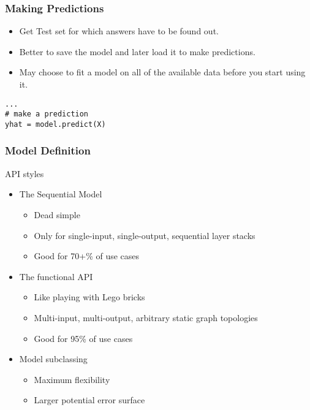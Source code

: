 \begin{frame}[fragile] \frametitle{Making Predictions}

\begin{itemize}
\item Get Test set for which answers have to be found out.
\item Better to save the model and later load it to make predictions. 
\item May choose to fit a model on all of the available data before you start using it.
\end{itemize}

\begin{lstlisting}
...
# make a prediction
yhat = model.predict(X)
\end{lstlisting}
\end{frame}
\begin{frame}[fragile] \frametitle{Model Definition}
API styles
\begin{itemize}
\item   The Sequential Model
\begin{itemize}
\item   Dead simple
\item   Only for single-input, single-output, sequential layer stacks
\item   Good for 70+\% of use cases
\end{itemize}
\item   The functional API
\begin{itemize}
\item   Like playing with Lego bricks
\item    Multi-input, multi-output, arbitrary static graph topologies
\item   Good for 95\% of use cases
\end{itemize}
\item   Model subclassing
\begin{itemize}
\item    Maximum flexibility
\item    Larger potential error surface
\end{itemize}
\end{itemize}
\end{frame}


